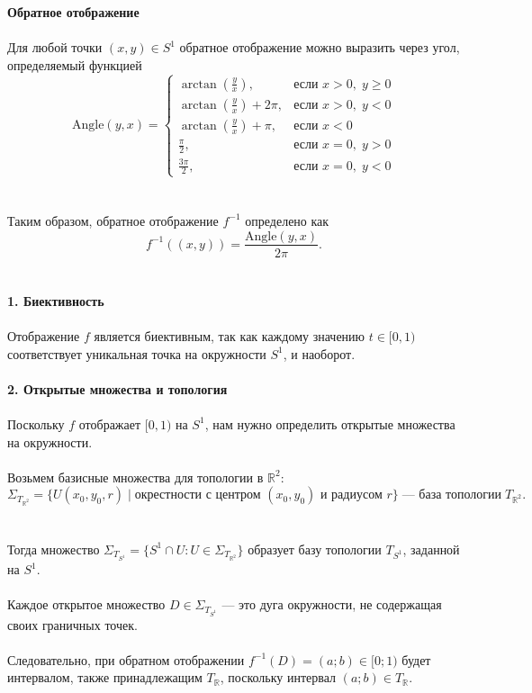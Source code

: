 \documentclass{article}
\begin{document}
        \textbf{Обратное отображение}\\ \\
        Для любой точки \((x, y) \in S^1\) обратное отображение можно выразить через угол, определяемый функцией
        \[
        \text{Angle}(y, x) = 
        \begin{cases} 
        \arctan\left(\frac{y}{x}\right), & \text{если } x > 0, \; y \geq 0 \\
        \arctan\left(\frac{y}{x}\right) + 2 \pi, & \text{если } x > 0, \; y < 0 \\
        \arctan\left(\frac{y}{x}\right) + \pi, & \text{если } x < 0 \\
        \frac{\pi}{2}, & \text{если } x = 0, \; y > 0 \\
        \frac{3\pi}{2}, & \text{если } x = 0, \; y < 0 
        \end{cases}
        \]\\ \\
        Таким образом, обратное отображение \( f^{-1} \) определено как
        \[
        f^{-1}((x, y)) = \frac{\text{Angle}(y, x)}{2\pi}.
        \]\\ \\
        \textbf{1. Биективность}\\ \\
        Отображение \( f \) является биективным, так как каждому значению \( t \in [0, 1) \) соответствует уникальная точка на окружности \( S^1 \), и наоборот.\\ \\
        \textbf{2. Открытые множества и топология}\\ \\
        Поскольку \( f \) отображает \([0, 1)\) на \( S^1 \), нам нужно определить открытые множества на окружности.\\ \\
        Возьмем базисные множества для топологии в \( \mathbb{R}^2 \):
        \[
        \Sigma_{T_{\mathbb{R}^2}} = \{U(x_0, y_0, r) \mid \text{окрестности с центром } (x_0, y_0) \text{ и радиусом } r \} \; \text{— база топологии} \; T_{\mathbb{R}^2}.
        \] \\ \\
        Тогда множество \( \Sigma_{T_{S^1}} = \{S^1 \cap U : U \in \Sigma_{T_{\mathbb{R}^2}}\} \) образует базу топологии \( T_{S^1} \), заданной на \( S^1 \).\\ \\
        Каждое открытое множество \( D \in \Sigma_{T_{S^1}} \) — это дуга окружности, не содержащая своих граничных точек.\\ \\ Следовательно, при обратном отображении \( f^{-1}(D) = (a; b) \in [0; 1) \) будет интервалом, также принадлежащим \( T_{\mathbb{R}} \), поскольку интервал \( (a; b) \in T_{\mathbb{R}} \).\\ \\
\end{document}
